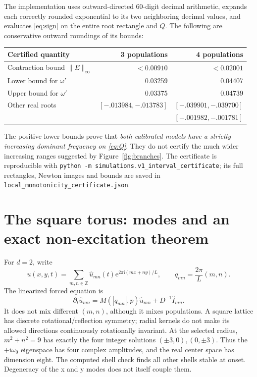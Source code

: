\documentclass[11pt]{article}
\newcommand{\ee}{\mathrm e}
\newcommand{\ii}{\mathrm i}
\begin{document}
The implementation uses outward-directed 60-digit decimal arithmetic, expands
each correctly rounded exponential to its two neighboring decimal values, and
evaluates \eqref{eq:sign} on the entire root rectangle and $Q$.
The following are conservative outward roundings of its bounds:
\begin{center}
\begin{tabular}{lrr}\toprule
Certified quantity&3 populations&4 populations\\\midrule
Contraction bound $\|E\|_\infty$&$<0.00910$&$<0.02001$\\
Lower bound for $\omega'$&0.03259&0.04407\\
Upper bound for $\omega'$&0.03375&0.04739\\
Other real roots&$[-.013984,-.013783]$&$[-.039901,-.039700]$\\
&&$[-.001982,-.001781]$\\\bottomrule
\end{tabular}
\end{center}
The positive lower bounds prove that \emph{both calibrated models have a
strictly increasing dominant frequency on \eqref{eq:Q}}.
They do not certify the much wider increasing ranges suggested by Figure~\ref{fig:branches}.
The certificate is reproducible with
\texttt{python -m simulations.v1\_interval\_certificate}; its full rectangles,
Newton images and bounds are saved in \texttt{local\_monotonicity\_certificate.json}.

\newpage
\section{The square torus: modes and an exact non-excitation theorem}
For $d=2$, write
\begin{equation}
 u(x,y,t)=\sum_{m,n\in\mathbb Z}\widehat u_{mn}(t)
 \ee^{2\pi\ii(mx+ny)/L},\qquad
 q_{mn}=\frac{2\pi}{L}(m,n).
\end{equation}
The linearized forced equation is
\begin{equation}
 \partial_t\widehat u_{mn}=M(|q_{mn}|,p)\widehat u_{mn}+D^{-1}\widehat I_{mn}.
 \label{eq:fourier2}
\end{equation}
It does not mix different $(m,n)$, although it mixes populations. A square
lattice has discrete rotational/reflection symmetry; radial kernels do not
make its allowed directions continuously rotationally invariant.
At the selected radius, $m^2+n^2=9$ has exactly the four integer solutions
$(\pm3,0),(0,\pm3)$. Thus the $+\ii\omega_0$ eigenspace has four complex
amplitudes, and the real center space has dimension eight. The computed
shell check finds all other shells stable at onset. Degeneracy of the x and y
modes does not itself couple them.
\end{document}
